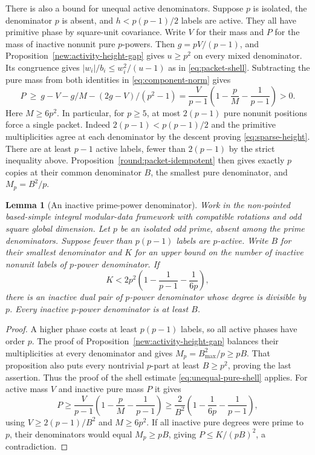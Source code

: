 \documentclass[11pt]{amsart}
\numberwithin{equation}{section}
\newtheorem{lemma}[theorem]{Lemma}
\theoremstyle{definition}
\theoremstyle{plain}
\begin{document}
There is also a bound for unequal active denominators. Suppose $p$ is isolated, the denominator $p$ is absent, and $h<p(p-1)/2$ labels are active. They all have primitive phase by square-unit covariance. Write $V$ for their mass and $P$ for the mass of inactive nonunit pure $p$-powers. Then $g=pV/(p-1)$, and Proposition~\ref{new:activity-height-gap} gives $u\ge p^2$ on every mixed denominator. Its congruence gives $|w_i|/b_i\le w_i^2/(u-1)$ as in \eqref{eq:packet-shell}. Subtracting the pure mass from both identities in \eqref{eq:component-norm} gives
\begin{equation}\label{eq:unequal-pure-shell}
 P\ \ge\ g-V-g/M-(2g-V)/(p^2-1)
   =\frac{V}{p-1}\left(1-\frac pM-\frac1{p-1}\right)>0.
\end{equation}
Here $M\ge6p^2$. In particular, for $p\ge5$, at most $2(p-1)$ pure nonunit positions force a single packet. Indeed $2(p-1)<p(p-1)/2$ and the primitive multiplicities agree at each denominator by the descent proving \eqref{eq:sparse-height}. There are at least $p-1$ active labels, fewer than $2(p-1)$ by the strict inequality above. Proposition~\ref{round:packet-idempotent} then gives exactly $p$ copies at their common denominator $B$, the smallest pure denominator, and $M_p=B^2/p$.

\begin{lemma}[An inactive prime-power denominator]\label{odd:inactive-pure}
Work in the non-pointed based-simple integral modular-data framework
with compatible rotations and odd square global dimension. Let $p$ be
an isolated odd prime, absent among the prime denominators. Suppose fewer than $p(p-1)$ labels are
$p$-active. Write $B$ for their smallest denominator and $K$ for an
upper bound on the number of inactive nonunit labels of $p$-power denominator.
If
\[
 K<2p^2\left(1-\frac1{p-1}-\frac1{6p}\right),
\]
there is an inactive dual pair of $p$-power denominator whose degree is
divisible by $p$. Every inactive $p$-power denominator is at least $B$.
\end{lemma}
\begin{proof}
A higher phase costs at least $p(p-1)$ labels, so all active phases
have order $p$. The proof of Proposition~\ref{new:activity-height-gap}
balances their multiplicities at every denominator and gives
$M_p=B_{\max}^2/p\ge pB$. That proposition also puts every
nontrivial $p$-part at least $B\ge p^2$, proving the last assertion.
Thus the proof of the shell estimate \eqref{eq:unequal-pure-shell} applies.
For active mass $V$ and inactive pure mass $P$ it gives
\[
 P\ge\frac{V}{p-1}\left(1-\frac pM-\frac1{p-1}\right)
 \ge\frac2{B^2}\left(1-\frac1{6p}-\frac1{p-1}\right),
\]
using $V\ge2(p-1)/B^2$ and $M\ge6p^2$.
If all inactive pure degrees were prime to $p$, their denominators
would equal $M_p\ge pB$, giving $P\le K/(pB)^2$, a contradiction.
\end{proof}
\end{document}
